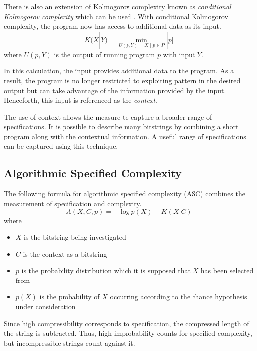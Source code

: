 There is also an extension of Kolmogorov complexity known as {\it conditional Kolmogorov complexity} which can be used \citep{Kolmogorov1968}.
With conditional Kolmogorov complexity, the program now has access to additional data as its input.
\begin{equation}
    K(X|Y) = \min_{U(p,Y) = X \mid p \in P} |p|
\end{equation} where $U(p,Y)$ is the output of running program $p$ with input $Y$.

In this calculation, the input provides additional data to the program.
As a result, the program is no longer restricted to exploiting pattern in the desired output but can take advantage of the information provided by the input.
Henceforth, this input is referenced as the {\it context}.

The use of context allows the measure to capture a broader range of specifications.
It is possible to describe many bitstrings by combining a short program along with the contextual information.
A useful range of specifications can be captured using this technique.

\subsection{Algorithmic Specified Complexity}

The following formula for algorithmic specified complexity (ASC) combines the measurement of specification and complexity.
\begin{equation}
    \label{ASC}
    A(X,C,p) = -\log p(X) - K(X|C)
\end{equation} where
\begin{itemize}
    \item $X$ is the bitstring being investigated
    \item $C$ is the context as a bitstring
    \item $p$ is the probability distribution which it is supposed that $X$ has been selected from
    \item $p(X)$ is the probability of $X$ occurring according to the chance hypothesis under consideration
\end{itemize}
Since high compressibility corresponds to specification, the compressed length of the string is subtracted.
Thus, high improbability counts for specified complexity, but incompressible strings count against it.

